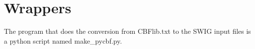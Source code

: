\documentclass[10pt,a4paper,twoside,notitlepage]{article}
\begin{document}
%
\section{Wrappers}

The program that does the conversion from CBFlib.txt to the SWIG
input files is a python script named make\_pycbf.py.
\end{document}
